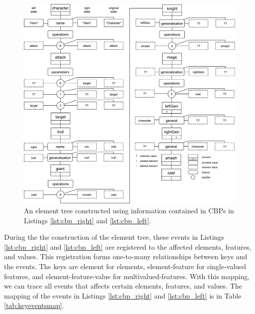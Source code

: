 \begin{figure}
    \centering
    \includegraphics[width=\linewidth]{element_tree_game}
    \caption{An element tree constructed using information contained in CBPs in Listings \ref{lst:cbp_right} and \ref{lst:cbp_left}.}
    \label{fig:element_tree_game}
\end{figure} 

During the the construction of the element tree, these events in Listings \ref{lst:cbp_right} and \ref{lst:cbp_left} are registered to the affected elements, features, and values. 
This registration forms one-to-many relationships between keys and the events. 
The keys are \textsf{element} for elements, \textsf{element-feature} for single-valued features, and \textsf{element-feature-value} for multivalued-features.
With this mapping, we can trace all events that affects certain elements, features, and values. 
The mapping of the events in Listings \ref{lst:cbp_right} and \ref{lst:cbp_left} is in Table \ref{tab:keyeventsmap}.

